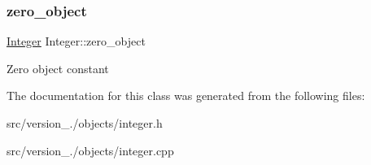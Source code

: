 \subsubsection{\texorpdfstring{zero\+\_\+object}{zero\_object}}
{\footnotesize\ttfamily \hyperlink{classez_1_1objects_1_1Integer}{Integer} Integer\+::zero\+\_\+object\hspace{0.3cm}{\ttfamily [static]}}

Zero object constant 

The documentation for this class was generated from the following files\+:\begin{DoxyCompactItemize}
\item 
src/version\+\_./objects/integer.\+h\item 
src/version\+\_./objects/integer.\+cpp\end{DoxyCompactItemize}
